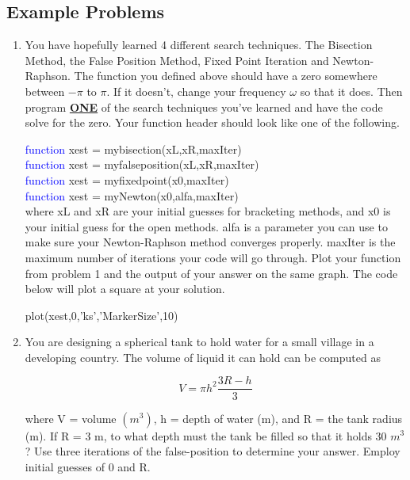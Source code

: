 \subsection{Example Problems}

\begin{enumerate}

\item You have hopefully learned 4 different search techniques. The
  Bisection Method, the False Position Method, Fixed Point
  Iteration and Newton-Raphson. The function you defined above should
  have a zero somewhere between $-\pi$ to $\pi$. If it doesn't, change your
  frequency $\omega$ so that it does. Then program
  {\bf\underline{ONE}} of the search techniques you've learned and
  have the code solve for the zero. Your function header should look like one of
  the following. 

  \textcolor{blue}{function} xest = mybisection(xL,xR,maxIter) \\
  \textcolor{blue}{function} xest = myfalseposition(xL,xR,maxIter) \\
  \textcolor{blue}{function} xest = myfixedpoint(x0,maxIter) \\
  \textcolor{blue}{function} xest = myNewton(x0,alfa,maxIter) \\

  where xL and xR are your initial guesses for bracketing methods, and
  x0 is your initial guess for the open methods. alfa
  is a parameter you can use to make sure your Newton-Raphson method
  converges properly. maxIter is the
  maximum number of iterations your code will go through. Plot your function
  from problem 1 and the output of your answer on the same graph. The
  code below will plot a square at your solution.  

  plot(xest,0,'ks','MarkerSize',10)

\item You are designing a spherical tank to hold water for a small
  village in a developing country. The volume of liquid it can hold
  can be computed as 

\begin{equation}
V = \pi h^2 \frac{3R-h}{3}
\end{equation}

where V = volume $(m^3)$, h = depth of water (m), and R = the tank
radius (m). If R = 3 m, to what depth must the tank be filled so that
it holds 30 $m^3$? Use three iterations of the false-position to
determine your answer. Employ initial guesses of 0 and R.


\end{enumerate}
